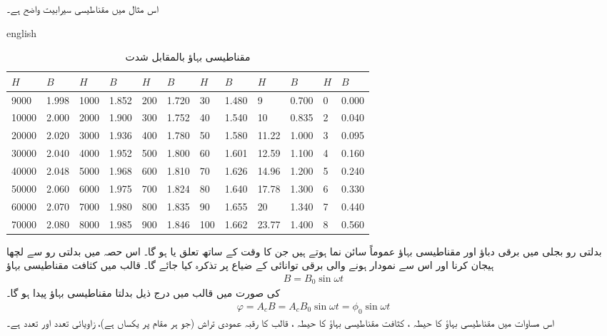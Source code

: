 اس مثال میں مقناطیسی سیرابیت  واضح ہے۔ 
%
\begin{table}
\caption{مقناطیسی بہاؤ بالمقابل شدت}
\label{جدول_مقناطیسی_ادوار_کثافت_بہاو_بالمقابل_شدت}
\begin{otherlanguage*}{english}
\begin{LTR}
\begin{tabular}{l l l l   l l l l   l l l l}
$H$&$B$&$H$&$B$&$H$&$B$&$H$&$B$&$H$&$B$&$H$&$B$\\
\midrule
9000&1.998&1000&1.852&           200&1.720 &30&1.480               &9&0.700&  0&0.000    \\
10000&2.000&2000&1.900&         300&1.752 &40&1.540           &10&0.835&  2&0.040    \\
20000&2.020&3000&1.936&         400&1.780 &50&1.580          &11.22&1.000&  3&0.095    \\
30000&2.040& 4000&1.952&        500&1.800 &60&1.601         &12.59&1.100 &  4&0.160    \\
40000&2.048&5000&1.968&         600&1.810 &70&1.626          &14.96&1.200&   5&0.240    \\
50000&2.060&6000&1.975&         700&1.824 &80&1.640         &17.78&1.300&  6&0.330    \\
60000&2.070&7000&1.980&         800&1.835  &90&1.655         &20&1.340&  7&0.440    \\
 70000&2.080&8000&1.985&        900&1.846 &100&1.662          &23.77&1.400& 8&0.560    \\
\bottomrule
\end{tabular}
\end{LTR}
\end{otherlanguage*}
\end{table}
%

بدلتی  رو بجلی میں برقی دباؤ اور مقناطیسی بہاؤ عموماً سائن نما ہوتے ہیں جن کا وقت کے ساتھ تعلق  یا  ہو گا۔ اس حصہ میں بدلتی رو سے لچھا ہیجان کرنا اور اس سے نمودار ہونے والی برقی توانائی  کے ضیاع  پر تذکرہ  کیا جائے گا۔  قالب میں کثافت مقناطیسی بہاؤ
\begin{align}
B=B_0 \sin \omega t
\end{align}
کی صورت میں قالب میں درج ذیل بدلتا مقناطیسی بہاؤ  پیدا ہو گا۔
\begin{align}
\varphi=A_c B=A_c B_0 \sin \omega t=\phi_0 \sin \omega t
\end{align}
اس مساوات میں مقناطیسی بہاؤ کا حیطہ  ، کثافت مقناطیسی بہاؤ کا حیطہ ، قالب کا رقبہ عمودی تراش   (جو ہر مقام پر یکساں ہے)، زاویائی تعدد   اور تعدد   ہے۔

